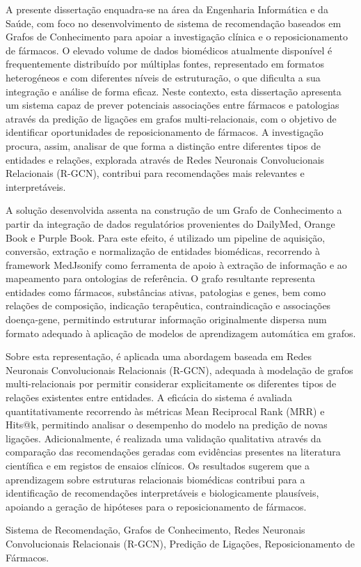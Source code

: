 A presente dissertação enquadra-se na área da Engenharia Informática e da Saúde, com foco no desenvolvimento de sistema de recomendação baseados em Grafos de Conhecimento para apoiar a investigação clínica e o reposicionamento de fármacos. O elevado volume de dados biomédicos atualmente disponível é frequentemente distribuído por múltiplas fontes, representado em formatos heterogéneos e com diferentes níveis de estruturação, o que dificulta a sua integração e análise de forma eficaz. Neste contexto, esta dissertação apresenta um sistema capaz de prever potenciais associações entre fármacos e patologias através da predição de ligações em grafos multi-relacionais, com o objetivo de identificar oportunidades de reposicionamento de fármacos. A investigação procura, assim, analisar de que forma a distinção entre diferentes tipos de entidades e relações, explorada através de Redes Neuronais Convolucionais Relacionais (R-GCN), contribui para recomendações mais relevantes e interpretáveis.

A solução desenvolvida assenta na construção de um Grafo de Conhecimento a partir da integração de dados regulatórios provenientes do DailyMed, Orange Book e Purple Book. Para este efeito, é utilizado um pipeline de aquisição, conversão, extração e normalização de entidades biomédicas, recorrendo à framework MedJsonify como ferramenta de apoio à extração de informação e ao mapeamento para ontologias de referência. O grafo resultante representa entidades como fármacos, substâncias ativas, patologias e genes, bem como relações de composição, indicação terapêutica, contraindicação e associações doença-gene, permitindo estruturar informação originalmente dispersa num formato adequado à aplicação de modelos de aprendizagem automática em grafos.

Sobre esta representação, é aplicada uma abordagem baseada em Redes Neuronais Convolucionais Relacionais (R-GCN), adequada à modelação de grafos multi-relacionais por permitir considerar explicitamente os diferentes tipos de relações existentes entre entidades. A eficácia do sistema é avaliada quantitativamente recorrendo às métricas Mean Reciprocal Rank (MRR) e Hits@k, permitindo analisar o desempenho do modelo na predição de novas ligações. Adicionalmente, é realizada uma validação qualitativa através da comparação das recomendações geradas com evidências presentes na literatura científica e em registos de ensaios clínicos. Os resultados sugerem que a aprendizagem sobre estruturas relacionais biomédicas contribui para a identificação de recomendações interpretáveis e biologicamente plausíveis, apoiando a geração de hipóteses para o reposicionamento de fármacos.

\begin{keywords}
Sistema de Recomendação, Grafos de Conhecimento, Redes Neuronais Convolucionais Relacionais (R-GCN), Predição de Ligações, Reposicionamento de Fármacos.
\end{keywords}
